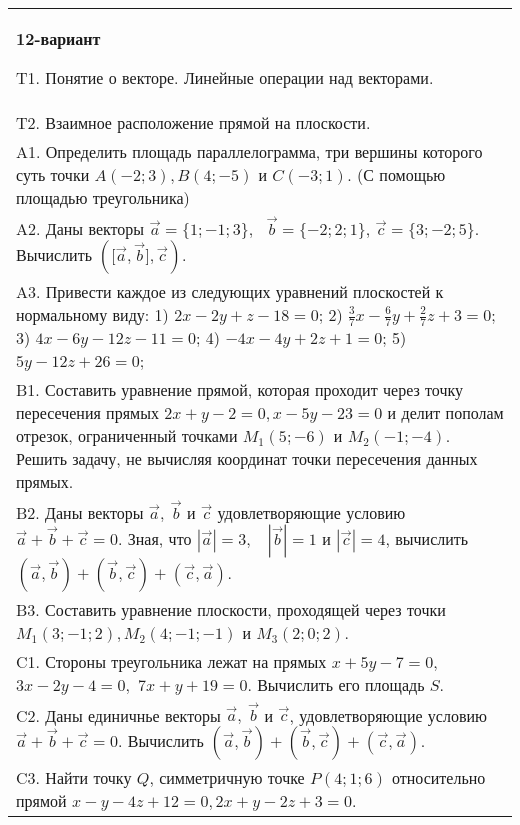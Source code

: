 \documentclass{article}
\begin{document}
\begin{tabular}{m{17cm}}
\textbf{12-вариант}
\newline

T1. 
Понятие о векторе. Линейные операции над векторами.
 \\
T2. 
Взаимное расположение прямой на плоскости.
 \\
A1. 
Определить площадь параллелограмма, три вершины которого суть точки \(A( - 2;3),B(4; - 5)\) и \(C( - 3;1)\). (С помощью площадью треугольника)
 \\
A2. 
Даны векторы \(\overrightarrow{a} = \{ 1; - 1;3\},\ \ \ \overrightarrow{b} = \{ - 2;2;1\}\), \(\overrightarrow{c} = \{ 3; - 2;5\}\). Вычислить \((\lbrack\overrightarrow{a},\overrightarrow{b}\rbrack,\overrightarrow{c})\).
 \\
A3. 
Привести каждое из следующих уравнений плоскостей к нормальному виду: 1) \(2x - 2y + z - 18 = 0\); 2) \(\frac{3}{7}x - \frac{6}{7}y + \frac{2}{7}z + 3 = 0\); 3) \(4x - 6y - 12z - 11 = 0\); 4) \(- 4x - 4y + 2z + 1 = 0\); 5) \(5y - 12z + 26 = 0\);
 \\
B1. 
Составить уравнение прямой, которая проходит через точку пересечения прямых \(2x + y - 2 = 0,x - 5y - 23 = 0\) и делит пополам отрезок, ограниченный точками \(M_{1}(5; - 6)\) и \(M_{2}( - 1; - 4)\). Решить задачу, не вычисляя координат точки пересечения данных прямых.
 \\
B2. 
Даны векторы \(\overrightarrow{a},\ \overrightarrow{b}\) и \(\overrightarrow{c}\) удовлетворяющие условию \(\overrightarrow{a} + \overrightarrow{b} + \overrightarrow{c} = 0\). Зная, что \(|\overrightarrow{a}| = 3,\ \ \ \ |\overrightarrow{b}| = 1\) и \(|\overrightarrow{c}| = 4\), вычислить \(\left( \overrightarrow{a},\overrightarrow{b} \right) + \left( \overrightarrow{b},\overrightarrow{c} \right) + \left( \overrightarrow{c},\overrightarrow{a} \right)\).
 \\
B3. 
Составить уравнение плоскости, проходящей через точки \(M_{1}(3; - 1;2),M_{2}(4; - 1; - 1)\) и \(M_{3}(2;0;2)\).
 \\
C1. 
Стороны треугольника лежат на прямых \(x + 5y - 7 = 0,\) \(3x - 2y - 4 = 0,\) \(7x + y + 19 = 0\). Вычислить его площадь \(S\).
 \\
C2. Даны единичнье векторы \(\overrightarrow{a},\ \overrightarrow{b}\) и \(\overrightarrow{c}\), удовлетворяющие условию \(\overrightarrow{a} + \overrightarrow{b} + \overrightarrow{c} = 0\). Вычислить \(\left( \overrightarrow{a},\overrightarrow{b} \right) + \left( \overrightarrow{b},\overrightarrow{c} \right) + \left( \overrightarrow{c},\overrightarrow{a} \right)\).
 \\
C3. 
Найти точку \(Q\), симметричную точке \(P(4;1;6)\) относительно прямой \(x - y - 4z + 12 = 0,2x + y - 2z + 3 = 0\).
 \\

\end{tabular}
\vspace{1cm}
\end{document}
